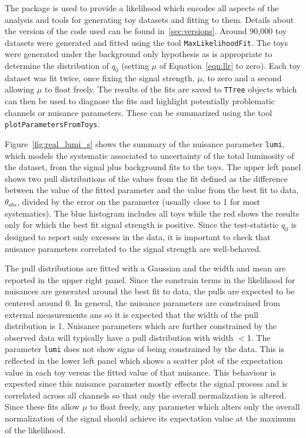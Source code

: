 The package is used to provide a likelihood which encodes all aspects of the analysis and tools for generating toy datasets and
fitting to them. Details about the version of the code used can be found in~\ref{sec:versions}. Around 90,000 toy datasets were generated and fitted
using the tool \texttt{MaxLikelihoodFit}. The toys were generated under the background only hypothesis as is appropriate to determine the 
distribution of $q_{0}$ (setting $\mu$ of Equation~\ref{eqn:llr} to zero).
Each toy dataset was fit twice, once fixing the signal strength, $\mu$, to zero and a second allowing $\mu$ to float freely.
The results of the fits are saved to \texttt{TTree} objects which can then be used to diagnose the fits and highlight potentially problematic
channels or nuisance parameters. These can be summarized using the tool \texttt{plotParametersFromToys}. 

Figure~\ref{fig:real_lumi_s} shows the summary of the nuisance parameter \texttt{lumi}, which models the systematic associated to uncertainty 
of the total luminosity of the dataset, from the signal plus background fits to the toys.
The upper left panel shows two pull distributions of the values from the fit defined as the difference between the value of the fitted parameter
and the value from the best fit to data, $\theta_{obs}$, divided by the error on the parameter (usually close to 1 for most systematics). 
The blue histogram includes all toys while the red shows the results
only for which the best fit signal strength is positive. Since the test-statistic $q_{0}$ is designed to report only excesses in the data,
it is important to check that nuisance parameters correlated to the signal strength are well-behaved.

The pull distributions are fitted with a Gaussian and the width and mean are reported in the upper right panel. Since the constrain terms in the 
likelihood for nuisances are generated around the best fit to data, the pulls are expected to be centered around 0. In general, the nuisance parameters
are constrained from external measurements ans so it is expected that the width of the pull distribution is 1. Nuisance parameters which are further
constrained by the observed data will typically have a pull distribution with width $<$1. The parameter \texttt{lumi} does not show signs of being constrained
by the data. This is reflected in the lower left panel which shows a scatter plot of the expectation value in each toy versus the fitted value of that 
nuisance. This behaviour is expected since this nuisance parameter mostly effects the signal process and is correlated across all channels so that only the overall
normalization is altered. Since these fits allow $\mu$ to float freely, any parameter which alters only the overall normalization of the signal should achieve its 
expectation value at the maximum of the likelihood. 

